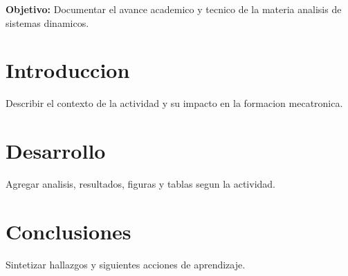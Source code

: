 \documentclass[spanish,letterpaper,oneside]{article}
\begin{document}
\templatePortrait
\templatePagecfg
\onehalfspacing

\begin{abstractd}
\textbf{Objetivo:} Documentar el avance academico y tecnico de la materia analisis de sistemas dinamicos.
\end{abstractd}

\templateIndex
\templateFinalcfg

\section{Introduccion}
Describir el contexto de la actividad y su impacto en la formacion mecatronica.

\section{Desarrollo}
Agregar analisis, resultados, figuras y tablas segun la actividad.

\section{Conclusiones}
Sintetizar hallazgos y siguientes acciones de aprendizaje.



\end{document}
